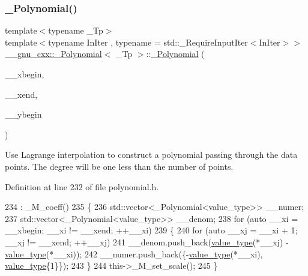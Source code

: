 \subsubsection{\texorpdfstring{\+\_\+\+Polynomial()}{\_Polynomial()}\hspace{0.1cm}{\footnotesize\ttfamily [8/9]}}
{\footnotesize\ttfamily template$<$typename \+\_\+\+Tp$>$ \\
template$<$typename In\+Iter , typename  = std\+::\+\_\+\+Require\+Input\+Iter$<$\+In\+Iter$>$$>$ \\
\hyperlink{class____gnu__cxx_1_1__Polynomial}{\+\_\+\+\_\+gnu\+\_\+cxx\+::\+\_\+\+Polynomial}$<$ \+\_\+\+Tp $>$\+::\hyperlink{class____gnu__cxx_1_1__Polynomial}{\+\_\+\+Polynomial} (\begin{DoxyParamCaption}\item[{const In\+Iter \&}]{\+\_\+\+\_\+xbegin,  }\item[{const In\+Iter \&}]{\+\_\+\+\_\+xend,  }\item[{const In\+Iter \&}]{\+\_\+\+\_\+ybegin }\end{DoxyParamCaption})\hspace{0.3cm}{\ttfamily [inline]}}

Use Lagrange interpolation to construct a polynomial passing through the data points. The degree will be one less than the number of points. 

Definition at line 232 of file polynomial.\+h.


\begin{DoxyCode}
234         : \_M\_coeff()
235         \{
236           std::vector<\_Polynomial<value\_type>> \_\_numer;
237           std::vector<\_Polynomial<value\_type>> \_\_denom;
238           \textcolor{keywordflow}{for} (\textcolor{keyword}{auto} \_\_xi = \_\_xbegin; \_\_xi != \_\_xend; ++\_\_xi)
239             \{
240               \textcolor{keywordflow}{for} (\textcolor{keyword}{auto} \_\_xj = \_\_xi + 1; \_\_xj != \_\_xend; ++\_\_xj)
241                 \_\_denom.push\_back(\hyperlink{class____gnu__cxx_1_1__Polynomial_a725563351f50e76084a7a016c06f8a53}{value\_type}(*\_\_xj) - \hyperlink{class____gnu__cxx_1_1__Polynomial_a725563351f50e76084a7a016c06f8a53}{value\_type}(*\_\_xi));
242               \_\_numer.push\_back(\{-\hyperlink{class____gnu__cxx_1_1__Polynomial_a725563351f50e76084a7a016c06f8a53}{value\_type}(*\_\_xi), \hyperlink{class____gnu__cxx_1_1__Polynomial_a725563351f50e76084a7a016c06f8a53}{value\_type}\{1\}\});
243             \}
244           this->\_M\_set\_scale();
245         \}
\end{DoxyCode}
\mbox{\label{class____gnu__cxx_1_1__Polynomial_ad6e0daed9aa3a89cd98441a0fc4fa9f1}} 
